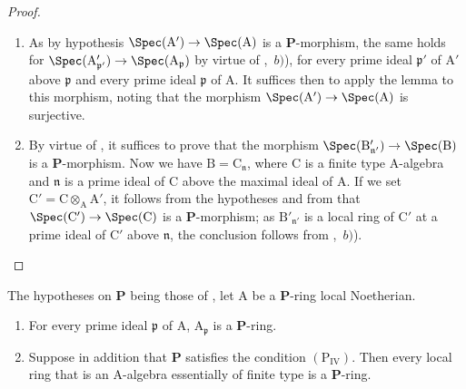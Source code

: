 \begin{proof}
\begin{enumerate}[label=(\roman*)]
  \item As by hypothesis $\Spec(\mathrm{A}')\to\Spec(\mathrm{A})$ is a $\boldsymbol{P}$-morphism, the same holds for $\Spec(\mathrm{A}'_{\mathfrak{p}'})\to\Spec(\mathrm{A}_\mathfrak{p})$ by virtue of ,~$b)$), for every prime ideal $\mathfrak{p}'$ of $\mathrm{A}'$ above $\mathfrak{p}$ and every prime ideal $\mathfrak{p}$ of $\mathrm{A}$.
  It suffices then to apply the lemma  to this morphism, noting that the morphism $\Spec(\mathrm{A}')\to\Spec(\mathrm{A})$ is surjective.

  \item By virtue of , it suffices to prove that the morphism $\Spec(\mathrm{B}'_{\mathfrak{n}'})\to\Spec(\mathrm{B})$ is a $\boldsymbol{P}$-morphism.
  Now we have $\mathrm{B}=\mathrm{C}_\mathfrak{n}$, where $\mathrm{C}$ is a finite type A-algebra and $\mathfrak{n}$ is a prime ideal of $\mathrm{C}$ above the maximal ideal of $\mathrm{A}$.
  If we set $\mathrm{C}'=\mathrm{C}\otimes_\mathrm{A}\mathrm{A}'$, it follows from the hypotheses and from  that $\Spec(\mathrm{C}')\to\Spec(\mathrm{C})$ is a $\boldsymbol{P}$-morphism; as $\mathrm{B}'_{\mathfrak{n}'}$ is a local ring of $\mathrm{C}'$ at a prime ideal of $\mathrm{C}'$ above $\mathfrak{n}$, the conclusion follows from ,~$b)$).
\end{enumerate}
\end{proof}

\begin{theorem}[7.4.4]
\label{IV.7.4.4}
The hypotheses on $\boldsymbol{P}$ being those of , let $\mathrm{A}$ be a $\boldsymbol{P}$-ring local Noetherian.
\begin{enumerate}[label=\emph{\roman*)}]
  \item For every prime ideal $\mathfrak{p}$ of $\mathrm{A}$, $\mathrm{A}_\mathfrak{p}$ is a $\boldsymbol{P}$-ring.
  \item Suppose in addition that $\boldsymbol{P}$ satisfies the condition $(\mathrm{P_{IV}})$.
  Then every local ring that is an A-algebra essentially of finite type is a $\boldsymbol{P}$-ring.
\end{enumerate}
\end{theorem}

